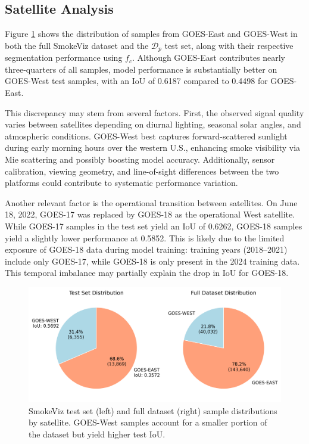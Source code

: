 \documentclass{article}
\begin{document}
\subsection{Satellite Analysis}

Figure \ref{sat_dataset} shows the distribution of samples from GOES-East and GOES-West in both the full SmokeViz dataset and the \(\mathcal{D}_p\) test set, along with their respective segmentation performance using \(f_c\). Although GOES-East contributes nearly three-quarters of all samples, model performance is substantially better on GOES-West test samples, with an IoU of 0.6187 compared to 0.4498 for GOES-East.

This discrepancy may stem from several factors. First, the observed signal quality varies between satellites depending on diurnal lighting, seasonal solar angles, and atmospheric conditions. GOES-West best captures forward-scattered sunlight during early morning hours over the western U.S., enhancing smoke visibility via Mie scattering and possibly boosting model accuracy. Additionally, sensor calibration, viewing geometry, and line-of-sight differences between the two platforms could contribute to systematic performance variation.

Another relevant factor is the operational transition between satellites. On June 18, 2022, GOES-17 was replaced by GOES-18 as the operational West satellite. While GOES-17 samples in the test set yield an IoU of 0.6262, GOES-18 samples yield a slightly lower performance at 0.5852. This is likely due to the limited exposure of GOES-18 data during model training: training years (2018–2021) include only GOES-17, while GOES-18 is only present in the 2024 training data. This temporal imbalance may partially explain the drop in IoU for GOES-18.

\begin{figure}[!htb]
    \centering
    \includegraphics[width=\linewidth]{stat_figs/satellite_test_full_dataset.png}
    \caption{SmokeViz test set (left) and full dataset (right) sample distributions by satellite. GOES-West samples account for a smaller portion of the dataset but yield higher test IoU.}
    \label{sat_dataset}
\end{figure}
\end{document}
